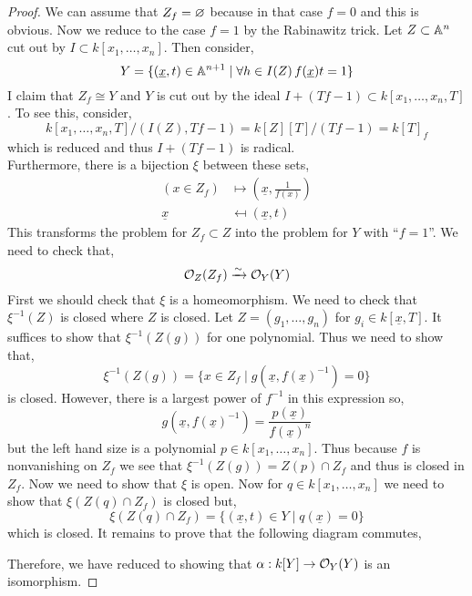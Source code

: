 \documentclass[12pt]{article}
\begin{document}
\begin{proof}
We can assume that $Z_f = \varnothing$ because in that case $f = 0$ and this is obvious. Now we reduce to the case $f = 1$ by the Rabinawitz trick. Let $Z \subset \mathbb{A}^n$ cut out by $I \subset k[x_1, \dots, x_n]$. Then consider,
\[ Y = \{ (\underline{x}, t) \in \mathbb{A}^{n+1} \mid \forall h \in I(Z) \, f(\underline{x}) t = 1 \} \]
I claim that $Z_f \cong Y$ and $Y$ is cut out by the ideal $I + (Tf - 1) \subset k[x_1, \dots, x_n, T]$. To see this, consider,
\[ k[x_1, \dots, x_n, T] / (I(Z), Tf - 1) = k[Z][T]/(T f - 1) = k[T]_f \]
which is reduced and thus $I + (T f - 1)$ is radical. 
\bigskip\\
Furthermore, there is a bijection $\xi$ between these sets,
\begin{align*}
(x \in Z_f) & \mapsto (\underline{x}, \tfrac{1}{f(x)}) 
\\
\underline{x} & \mapsfrom (\underline{x}, t) 
\end{align*}
This transforms the problem for $Z_f \subset Z$ into the problem for $Y$ with ``$f = 1$''. We need to check that,
\[ \mathcal{O}_{Z}(Z_f) \xrightarrow{\sim} \mathcal{O}_{Y}(Y) \]
First we should check that $\xi$ is a homeomorphism. We need to check that $\xi^{-1}(Z)$ is closed where $Z$ is closed. Let $Z = (g_1, \dots, g_n)$ for $g_i \in k[\underline{x}, T]$. It suffices to show that $\xi^{-1}(Z(g))$ for one polynomial. Thus we need to show that,
\[ \xi^{-1}(Z(g)) = \{ x \in Z_f \mid g(\underline{x}, f(\underline{x})^{-1}) = 0 \} \]
is closed. However, there is a largest power of $f^{-1}$ in this expression so,
\[ g(\underline{x}, f(\underline{x})^{-1}) = \frac{p(\underline{x})}{f(\underline{x})^n} \]
but the left hand size is a polynomial $p \in k[x_1, \dots, x_n]$. Thus because $f$ is nonvanishing on $Z_f$ we see that $\xi^{-1}(Z(g)) = Z(p) \cap Z_f$ and thus is closed in $Z_f$. Now we need to show that $\xi$ is open. Now for $q \in k[x_1, \dots, x_n]$ we need to show that $\xi(Z(q) \cap Z_f)$ is closed but,
\[ \xi(Z(q) \cap Z_f) = \{ (\underline{x}, t) \in Y \mid q(\underline{x}) = 0 \} \]
which is closed. It remains to prove that the following diagram commutes,
\begin{center}
\end{center}
Therefore, we have reduced to showing that $\alpha : k[Y] \to \mathcal{O}_{Y}(Y)$ is an isomorphism. 

\end{proof}
\end{document}
